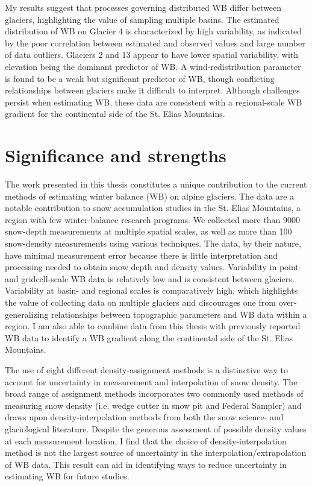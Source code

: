\documentclass{sfuthesis}
\begin{document}
{My results suggest that processes governing distributed WB differ between glaciers, highlighting the value of sampling multiple basins. The estimated distribution of WB on Glacier 4 is characterized by high variability, as indicated by the poor correlation between estimated and observed values and large number of data outliers. Glaciers 2 and 13 appear to have lower spatial variability, with elevation being the dominant predictor of WB. A wind-redistribution parameter is found to be a weak but significant predictor of WB, though conflicting relationships between glaciers make it difficult to interpret. Although challenges persist when estimating WB, these data are consistent with a regional-scale WB gradient for the continental side of the St. Elias Mountains.


\section{Significance and strengths}

The work presented in this thesis constitutes a unique contribution to the current methods of estimating winter balance (WB) on alpine glaciers. The data are a notable contribution to snow accumulation studies in the St. Elias Mountains, a region with few winter-balance research programs. We collected more than 9000 snow-depth measurements at multiple spatial scales, as well as more than 100 snow-density measurements using various techniques. The data, by their nature, have minimal measurement error because there is little interpretation and processing needed to obtain snow depth and density values. Variability in point- and gridcell-scale WB data is relatively low and is consistent between glaciers. Variability at basin- and regional scales is comparatively high, which highlights the value of collecting data on multiple glaciers and discourages one from over-generalizing relationships between topographic parameters and WB data within a region. I am also able to combine data from this thesis with previously reported WB data to identify a WB gradient along the continental side of the St. Elias Mountains. 

The use of eight different density-assignment methods is a distinctive way to account for uncertainty in  measurement and interpolation of snow density. The broad range of assignment methods incorporates two commonly used methods of measuring snow density (i.e. wedge cutter in snow pit and Federal Sampler) and draws upon density-interpolation methods from both the snow science- and glaciological literature. Despite the generous assessment of possible density values at each measurement location, I find that the choice of density-interpolation method is not the largest source of uncertainty in the interpolation/extrapolation of WB data. This result can aid in identifying ways to reduce uncertainty in estimating WB for future studies. 

}
\end{document}
